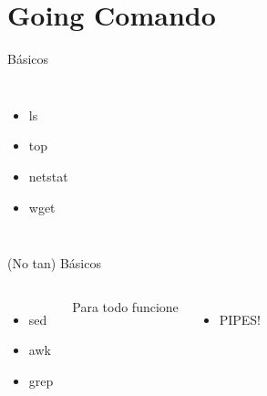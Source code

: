 \section{Going Comando}

\begin{frame}{B\'asicos}
\begin{columns}[onlytextwidth]
\begin{itemize}
	\item ls
	\item top
	\item netstat
	\item wget
\end{itemize}
\end{columns}
\end{frame}

\begin{frame}{(No tan) B\'asicos}
\begin{columns}[onlytextwidth]
\begin{itemize}
	\item sed
	\item awk
	\item grep
\end{itemize}
Para todo funcione
\begin{itemize}
	\item PIPES!
\end{itemize}
\end{columns}
\end{frame}

